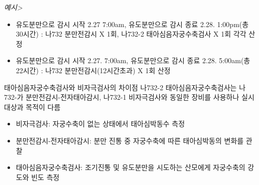 \emph{예시>}\par
\begin{itemize}\tightlist
\item 유도분만으로 감시 시작 2.27 7:00am, 유도분만으로 감시 종료 2.28. 1:00pm(총 30시간)
 :  나732 분만전감시 X 1회, 나732-2 태아심음자궁수축검사 X 1회 각각 산정
\item 유도분만으로 감시 시작 2.27. 7:00am, 유도분만으로 감시 종료 2.28. 5:00am(총 22시간)
        :  나732 분만전감시(12시간초과) X 1회 산정
\end{itemize}
\prezi{\clearpage}
\begin{commentbox}{태아심음자궁수축검사와 비자극검사의 차이점}
나732-2 태아심음자궁수축검사는 나732-가 분만전감시-전자태아감시, 나732-1 비자극검사와 동일한 장비를 사용하나 실시대상과 목적이 다름
\begin{itemize}\tightlist
\item 비자극검사: 자궁수축이 없는 상태에서 태아심박동수 측정
\item 분만전감시-전자태아감시: 분만 진통 중 자궁수축에 따른 태아심박동의 변화를 관찰
\item 태아심음자궁수축검사: 조기진통 및 유도분만을 시도하는 산모에게 자궁수축의 강도와 빈도 측정
\end{itemize}
\end{commentbox}